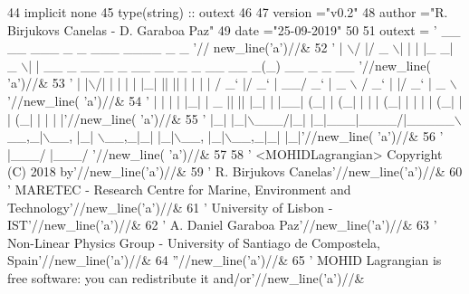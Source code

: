 \begin{DoxyCode}
44     \textcolor{keywordtype}{implicit none}
45     \textcolor{keywordtype}{type}(string) :: outext
46 
47     version  =\textcolor{stringliteral}{"v0.2"}
48     author   =\textcolor{stringliteral}{"R. Birjukovs Canelas - D. Garaboa Paz"}
49     date     =\textcolor{stringliteral}{"25-09-2019"}
50 
51     outext = \textcolor{stringliteral}{' \_\_  \_\_  \_\_\_  \_   \_ \_\_\_ \_\_\_\_  \_                                      \_              '}//
      new\_line(\textcolor{stringliteral}{'a'})//&
52         \textcolor{stringliteral}{' |  \(\backslash\)/  |/ \_ \(\backslash\)| | | |\_ \_|  \_ \(\backslash\)| |    \_\_ \_  \_\_ \_ \_ \_\_ \_\_ \_ \_ \_\_   \_\_ \_(\_) \_\_ \_ \_ \_\_  '}//new\_line(\textcolor{stringliteral}{
      'a'})//&
53         \textcolor{stringliteral}{' | |\(\backslash\)/| | | | | |\_| || || | | | |   / \_` |/ \_` | \_\_/  \_` |  \_ \(\backslash\) / \_` | |/ \_` |  \_ \(\backslash\) '}//new\_line(\textcolor{stringliteral}{
      'a'})//&
54         \textcolor{stringliteral}{' | |  | | |\_| |  \_  || || |\_| | |\_\_| (\_| | (\_| | | | (\_| | | | | (\_| | | (\_| | | | |'}//new\_line(\textcolor{stringliteral}{
      'a'})//&
55         \textcolor{stringliteral}{' |\_|  |\_|\(\backslash\)\_\_\_/|\_| |\_|\_\_\_|\_\_\_\_/|\_\_\_\_\_\(\backslash\)\_\_,\_|\(\backslash\)\_\_, |\_|  \(\backslash\)\_\_,\_|\_| |\_|\(\backslash\)\_\_, |\_|\(\backslash\)\_\_,\_|\_| |\_|'}//new\_line(\textcolor{stringliteral}{
      'a'})//&
56         \textcolor{stringliteral}{'                                          |\_\_\_/                 |\_\_\_/               '}//new\_line(\textcolor{stringliteral}{
      'a'})//&
57 
58         \textcolor{stringliteral}{'  <MOHIDLagrangian> Copyright (C) 2018 by'}//new\_line(\textcolor{stringliteral}{'a'})//&
59         \textcolor{stringliteral}{'  R. Birjukovs Canelas'}//new\_line(\textcolor{stringliteral}{'a'})//&
60         \textcolor{stringliteral}{'  MARETEC - Research Centre for Marine, Environment and Technology'}//new\_line(\textcolor{stringliteral}{'a'})//&
61         \textcolor{stringliteral}{'  University of Lisbon - IST'}//new\_line(\textcolor{stringliteral}{'a'})//&
62         \textcolor{stringliteral}{'  A. Daniel Garaboa Paz'}//new\_line(\textcolor{stringliteral}{'a'})//&
63         \textcolor{stringliteral}{'  Non-Linear Physics Group - University of Santiago de Compostela, Spain'}//new\_line(\textcolor{stringliteral}{'a'})//&
64         \textcolor{stringliteral}{''}//new\_line(\textcolor{stringliteral}{'a'})//&
65         \textcolor{stringliteral}{'  MOHID Lagrangian is free software: you can redistribute it and/or'}//new\_line(\textcolor{stringliteral}{'a'})//&

\end{DoxyCode}

